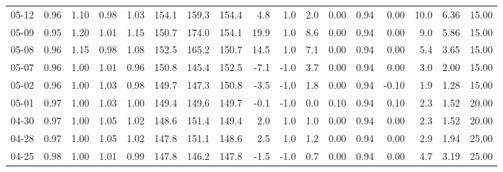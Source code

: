 \begin{threeparttable}
{\begin{tabular}{lrrrrrrrrrrrrrrrr}
  05-12 &         0.96 &           1.10 &          0.98 &          1.03 & 154.1 & 159.3 & 154.4 &        4.8 &                      1.0 &                 2.0 &       0.00 &      0.94 &           0.00 &             10.0 &            6.36 &                  15.00 \\
  05-09 &         0.95 &           1.20 &          1.01 &          1.15 & 150.7 & 174.0 & 154.1 &       19.9 &                      1.0 &                 8.6 &       0.00 &      0.94 &           0.00 &              9.0 &            5.86 &                  15.00 \\
  05-08 &         0.96 &           1.15 &          0.98 &          1.08 & 152.5 & 165.2 & 150.7 &       14.5 &                      1.0 &                 7.1 &       0.00 &      0.94 &           0.00 &              5.4 &            3.65 &                  15.00 \\
  05-07 &         0.96 &           1.00 &          1.01 &          0.96 & 150.8 & 145.4 & 152.5 &       -7.1 &                     -1.0 &                 3.7 &       0.00 &      0.94 &           0.00 &              3.0 &            2.00 &                  15.00 \\
  05-02 &         0.96 &           1.00 &          1.03 &          0.98 & 149.7 & 147.3 & 150.8 &       -3.5 &                     -1.0 &                 1.8 &       0.00 &      0.94 &          -0.10 &              1.9 &            1.28 &                  15.00 \\
  05-01 &         0.97 &           1.00 &          1.03 &          1.00 & 149.4 & 149.6 & 149.7 &       -0.1 &                     -1.0 &                 0.0 &       0.10 &      0.94 &           0.10 &              2.3 &            1.52 &                  20.00 \\
  04-30 &         0.97 &           1.00 &          1.05 &          1.02 & 148.6 & 151.4 & 149.4 &        2.0 &                      1.0 &                 1.0 &       0.00 &      0.94 &           0.00 &              2.3 &            1.52 &                  20.00 \\
  04-28 &         0.97 &           1.00 &          1.05 &          1.02 & 147.8 & 151.1 & 148.6 &        2.5 &                      1.0 &                 1.2 &       0.00 &      0.94 &           0.00 &              2.9 &            1.94 &                  25.00 \\
  04-25 &         0.98 &           1.00 &          1.01 &          0.99 & 147.8 & 146.2 & 147.8 &       -1.5 &                     -1.0 &                 0.7 &       0.00 &      0.94 &           0.00 &              4.7 &            3.19 &                  25.00 \\

\end{tabular}}
\end{threeparttable}
